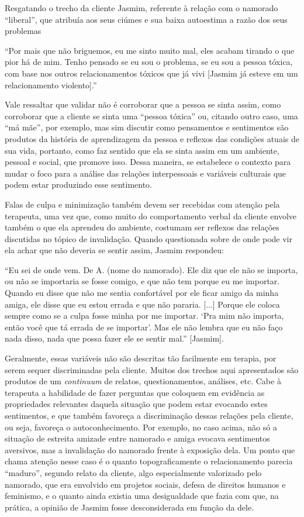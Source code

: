 Resgatando o trecho da cliente Jasmim, referente à relação com o namorado ``liberal'', que atribuía aos seus ciúmes e sua baixa autoestima a razão dos seus problemas

``Por mais que não briguemos, eu me sinto muito mal, eles acabam tirando o que pior há de mim. Tenho pensado se eu sou o problema, se eu sou a pessoa tóxica, com base nos outros relacionamentos tóxicos que já vivi [Jasmim já esteve em um relacionamento violento].''

Vale ressaltar que validar não é corroborar que a pessoa se sinta assim, como corroborar que a cliente se sinta uma ``pessoa tóxica'' ou, citando outro caso, uma ``má mãe'', por exemplo, mas sim discutir como pensamentos e sentimentos são produtos da história de aprendizagem da pessoa e reflexos das condições atuais de sua vida, portanto, como faz sentido que ela se sinta assim em um ambiente, pessoal e social, que promove isso. Dessa maneira, se estabelece o contexto para mudar o foco para a análise das relações interpessoais e variáveis culturais que podem estar produzindo esse sentimento. 

Falas de culpa e minimização também devem ser recebidas com atenção pela terapeuta, uma vez que, como muito do comportamento verbal da cliente envolve também o que ela aprendeu do ambiente, costumam ser reflexos das relações discutidas no tópico de invalidação. Quando questionada sobre de onde pode vir ela achar que não deveria se sentir assim, Jasmim respondeu:

``Eu sei de onde vem. De A. (nome do namorado). Ele diz que ele não se importa, ou não se importaria se fosse comigo, e que não tem porque eu me importar. Quando eu disse que não me sentia confortável por ele ficar amigo da minha amiga, ele disse que eu estou errada e que não pararia. [...] Porque ele coloca sempre como se a culpa fosse minha por me importar. ‘Pra mim não importa, então você que tá errada de se importar’. Mas ele não lembra que eu não faço nada disso, nada que possa fazer ele se sentir mal.'' [Jasmim].

Geralmente, essas variáveis não são descritas tão facilmente em terapia, por serem sequer discriminadas pela cliente. Muitos dos trechos aqui apresentados são produtos de um \textit{continuum} de relatos, questionamentos, análises, etc. Cabe à terapeuta a habilidade de fazer perguntas que coloquem em evidência as propriedades relevantes daquela situação que podem estar evocando estes sentimentos, e que também favoreça a discriminação dessas relações pela cliente, ou seja, favoreça o autoconhecimento. Por exemplo, no caso acima, não só a situação de estreita amizade entre namorado e amiga evocava sentimentos aversivos, mas a invalidação do namorado frente à exposição dela. Um ponto que chama atenção nesse caso é o quanto topograficamente o relacionamento parecia ``maduro'', segundo relato da cliente, algo especialmente valorizado pelo namorado, que era envolvido em projetos sociais, defesa de direitos humanos e feminismo, e o quanto ainda existia uma desigualdade que fazia com que, na prática, a opinião de Jasmim fosse desconsiderada em função da dele. 

